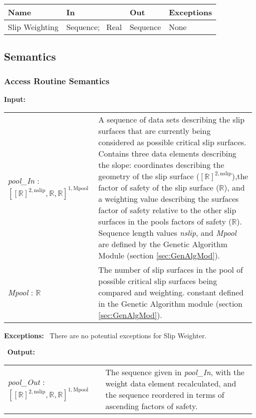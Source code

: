 \documentclass[12pt, titlepage]{article}
\begin{document}
\begin{center}
	\renewcommand*{\arraystretch}{1.5}
	\begin{tabular} {p{}  p{}  p{} 
			p{} } \hline 
		\textbf{Name} & \textbf{In} & \textbf{Out} & \textbf{Exceptions} \\ 
		\hline

  Slip Weighting & Sequence; ~\newline Real & Sequence & None
  \\ \hline
\end{tabular}
\end{center}

\subsection{Semantics}

\subsubsection{Access Routine Semantics}
\textbf{Input:} 
\renewcommand*{\arraystretch}{1.5}
\begin{longtable}{p{} p{}}
  \textit{pool\_In} : $[[\mathbb{R}]^{2,\text{nslip}}, \mathbb{R},
    \mathbb{R}]^{1,\text{Mpool}}$ & A sequence of data sets describing
  the slip surfaces that are currently being considered as possible
  critical slip surfaces. Contains three data elements describing the
  slope: coordinates describing the geometry of the slip surface
  ($[\mathbb{R}]^{2,\text{nslip}}$),the factor of safety of the slip
  surface ($\mathbb{R}$), and a weighting value describing the
  surfaces factor of safety relative to the other slip surfaces in the
  pools factors of safety ($\mathbb{R}$). Sequence length values
  \textit{nslip}, and \textit{Mpool} are defined by the Genetic
  Algorithm Module (section \ref{sec:GenAlgMod}). \\

  \textit{Mpool} : $\mathbb{R}$ & The number of slip surfaces in the
  pool of possible critical slip surfaces being compared and
  weighting. constant defined in the Genetic Algorithm module (section
  \ref{sec:GenAlgMod}).
\end{longtable}

\noindent \textbf{Exceptions:} ~\newline\noindent There are no
potential exceptions for Slip Weighter.

~\newline\noindent \textbf{Output:}
\renewcommand*{\arraystretch}{1.5}
\begin{longtable}{p{} p{}}
  \textit{pool\_Out} : $[[\mathbb{R}]^{2,\text{nslip}}, \mathbb{R},
    \mathbb{R}]^{1,\text{Mpool}}$ & The sequence given in
  \textit{pool\_In}, with the weight data element recalculated, and
  the sequence reordered in terms of ascending factors of safety. \\
\end{longtable}
\end{document}
